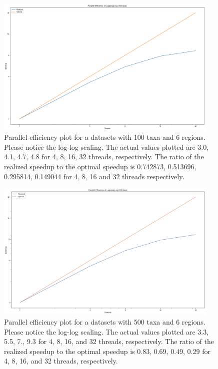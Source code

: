 \documentclass{article}
\begin{document}
\begin{figure}
  \begin{center}
    \includegraphics[width=0.95\textwidth]{figures/peff_100_taxa.png}
  \end{center}
  \caption{Parallel efficiency plot for a datasets with 100 taxa and 6 regions. Please notice the log-log scaling. The
    actual values plotted are 3.0, 4.1, 4.7, 4.8 for 4, 8, 16, 32 threads, respectively. The ratio of the realized
    speedup to the optimal speedup is 0.742873, 0.513696, 0.295814, 0.149044 for 4, 8, 16 and 32 threads respectively.}
  \label{fig:peff-100-taxa}
\end{figure}

\begin{figure}
  \begin{center}
    \includegraphics[width=0.95\textwidth]{figures/peff_500_taxa.png}
  \end{center}
  \caption{Parallel efficiency plot for a datasets with 500 taxa and 6 regions. Please notice the log-log scaling. The
    actual values plotted are 3.3, 5.5, 7., 9.3 for 4, 8, 16, and 32 threads, respectively. The ratio of the realized
    speedup to the optimal speedup is 0.83, 0.69, 0.49, 0.29 for 4, 8, 16, and 32 threads, respectively.}
  \label{fig:peff-100-taxa}
\end{figure}
\end{document}
